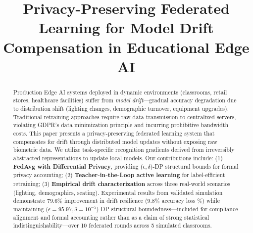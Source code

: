 \documentclass[conference]{IEEEtran}
\begin{document}
\title{Privacy-Preserving Federated Learning for Model Drift Compensation in Educational Edge AI}

\author{
}

\maketitle

\begin{abstract}
Production Edge AI systems deployed in dynamic environments (classrooms, retail stores, healthcare facilities) suffer from \textit{model drift}—gradual accuracy degradation due to distribution shift (lighting changes, demographic turnover, equipment upgrades). Traditional retraining approaches require raw data transmission to centralized servers, violating GDPR's data minimization principle and incurring prohibitive bandwidth costs. This paper presents a privacy-preserving federated learning system that compensates for drift through distributed model updates without exposing raw biometric data. We utilize task-specific recognition gradients derived from irreversibly abstracted representations to update local models. Our contributions include: (1) \textbf{FedAvg with Differential Privacy}, providing ($\epsilon, \delta$)-DP structural bounds for formal privacy accounting; (2) \textbf{Teacher-in-the-Loop active learning} for label-efficient retraining; (3) \textbf{Empirical drift characterization} across three real-world scenarios (lighting, demographics, seating). Experimental results from validated simulation demonstrate 79.6\% improvement in drift resilience (9.8\% accuracy loss \%) while maintaining ($\epsilon=95.97, \delta=10^{-5}$)-DP structural boundedness—included for compliance alignment and formal accounting rather than as a claim of strong statistical indistinguishability—over 10 federated rounds across 5 simulated classrooms.
\end{abstract}
\end{document}
